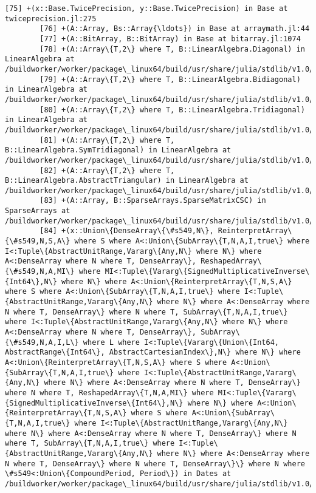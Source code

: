 \documentclass[11pt]{article}
\begin{document}
\begin{Verbatim}[commandchars=\\\{\}]
        [75] +(x::Base.TwicePrecision, y::Base.TwicePrecision) in Base at twiceprecision.jl:275
        [76] +(A::Array, Bs::Array{\ldots}) in Base at arraymath.jl:44
        [77] +(A::BitArray, B::BitArray) in Base at bitarray.jl:1074
        [78] +(A::Array\{T,2\} where T, B::LinearAlgebra.Diagonal) in LinearAlgebra at /buildworker/worker/package\_linux64/build/usr/share/julia/stdlib/v1.0/LinearAlgebra/src/special.jl:88
        [79] +(A::Array\{T,2\} where T, B::LinearAlgebra.Bidiagonal) in LinearAlgebra at /buildworker/worker/package\_linux64/build/usr/share/julia/stdlib/v1.0/LinearAlgebra/src/special.jl:88
        [80] +(A::Array\{T,2\} where T, B::LinearAlgebra.Tridiagonal) in LinearAlgebra at /buildworker/worker/package\_linux64/build/usr/share/julia/stdlib/v1.0/LinearAlgebra/src/special.jl:88
        [81] +(A::Array\{T,2\} where T, B::LinearAlgebra.SymTridiagonal) in LinearAlgebra at /buildworker/worker/package\_linux64/build/usr/share/julia/stdlib/v1.0/LinearAlgebra/src/special.jl:97
        [82] +(A::Array\{T,2\} where T, B::LinearAlgebra.AbstractTriangular) in LinearAlgebra at /buildworker/worker/package\_linux64/build/usr/share/julia/stdlib/v1.0/LinearAlgebra/src/special.jl:125
        [83] +(A::Array, B::SparseArrays.SparseMatrixCSC) in SparseArrays at /buildworker/worker/package\_linux64/build/usr/share/julia/stdlib/v1.0/SparseArrays/src/sparsematrix.jl:1563
        [84] +(x::Union\{DenseArray\{\#s549,N\}, ReinterpretArray\{\#s549,N,S,A\} where S where A<:Union\{SubArray\{T,N,A,I,true\} where I<:Tuple\{AbstractUnitRange,Vararg\{Any,N\} where N\} where A<:DenseArray where N where T, DenseArray\}, ReshapedArray\{\#s549,N,A,MI\} where MI<:Tuple\{Vararg\{SignedMultiplicativeInverse\{Int64\},N\} where N\} where A<:Union\{ReinterpretArray\{T,N,S,A\} where S where A<:Union\{SubArray\{T,N,A,I,true\} where I<:Tuple\{AbstractUnitRange,Vararg\{Any,N\} where N\} where A<:DenseArray where N where T, DenseArray\} where N where T, SubArray\{T,N,A,I,true\} where I<:Tuple\{AbstractUnitRange,Vararg\{Any,N\} where N\} where A<:DenseArray where N where T, DenseArray\}, SubArray\{\#s549,N,A,I,L\} where L where I<:Tuple\{Vararg\{Union\{Int64, AbstractRange\{Int64\}, AbstractCartesianIndex\},N\} where N\} where A<:Union\{ReinterpretArray\{T,N,S,A\} where S where A<:Union\{SubArray\{T,N,A,I,true\} where I<:Tuple\{AbstractUnitRange,Vararg\{Any,N\} where N\} where A<:DenseArray where N where T, DenseArray\} where N where T, ReshapedArray\{T,N,A,MI\} where MI<:Tuple\{Vararg\{SignedMultiplicativeInverse\{Int64\},N\} where N\} where A<:Union\{ReinterpretArray\{T,N,S,A\} where S where A<:Union\{SubArray\{T,N,A,I,true\} where I<:Tuple\{AbstractUnitRange,Vararg\{Any,N\} where N\} where A<:DenseArray where N where T, DenseArray\} where N where T, SubArray\{T,N,A,I,true\} where I<:Tuple\{AbstractUnitRange,Vararg\{Any,N\} where N\} where A<:DenseArray where N where T, DenseArray\} where N where T, DenseArray\}\} where N where \#s549<:Union\{CompoundPeriod, Period\}) in Dates at /buildworker/worker/package\_linux64/build/usr/share/julia/stdlib/v1.0/Dates/src/periods.jl:358

\end{Verbatim}
\end{document}
